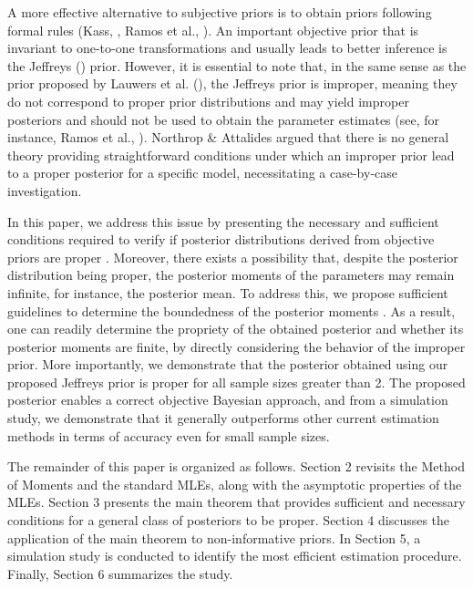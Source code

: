 \documentclass[12pt]{interact}
\theoremstyle{plain}%
\theoremstyle{definition}
\theoremstyle{remark}
\begin{document}
A more effective alternative to subjective priors is to obtain priors following formal rules (Kass, \cite{kass1996selection}, Ramos et al., \cite{ramos2016efficient}). An important objective prior that is invariant to one-to-one transformations and usually leads to better inference is the Jeffreys (\cite{jeffreys1946invariant}) prior. However, it is essential to note that, in the same sense as the prior proposed by Lauwers et al. (\cite{lauwers2009estimating}), the Jeffreys prior is improper, meaning they do not correspond to proper prior distributions and may yield improper posteriors and should not be used to obtain the parameter estimates (see, for instance, Ramos et al., \cite{ramos2023power}).
Northrop \& Attalides \cite{northrop2016} argued that there is no general theory providing straightforward conditions under which an improper prior lead to a proper posterior for a specific model, necessitating a case-by-case investigation.

In this paper, we address this issue by presenting the necessary and sufficient conditions required to verify if posterior distributions derived from objective priors are proper \cite{ferreira2020objective,ramos2021bayesian}. Moreover, there exists a possibility that, despite the posterior distribution being proper, the posterior moments of the parameters may remain infinite, for instance, the posterior mean. To address this, we propose sufficient guidelines to determine the boundedness of the posterior moments \cite{ramos2020posterior}. As a result, one can readily determine the propriety of the obtained posterior and whether its posterior moments are finite, by directly considering the behavior of the improper prior. More importantly, we demonstrate that the posterior obtained using our proposed Jeffreys prior is proper for all sample sizes greater than 2. The proposed posterior enables a correct objective Bayesian approach, and from a simulation study, we demonstrate that it generally outperforms other current estimation methods in terms of accuracy even for small sample sizes.

The remainder of this paper is organized as follows. Section 2 revisits the Method of Moments and the standard MLEs, along with the asymptotic properties of the MLEs. Section 3 presents the main theorem that provides sufficient and necessary conditions for a general class of posteriors to be proper. Section 4 discusses the application of the main theorem to non-informative priors. In Section 5, a simulation study is conducted to identify the most efficient estimation procedure. Finally, Section 6 summarizes the study.
\end{document}
